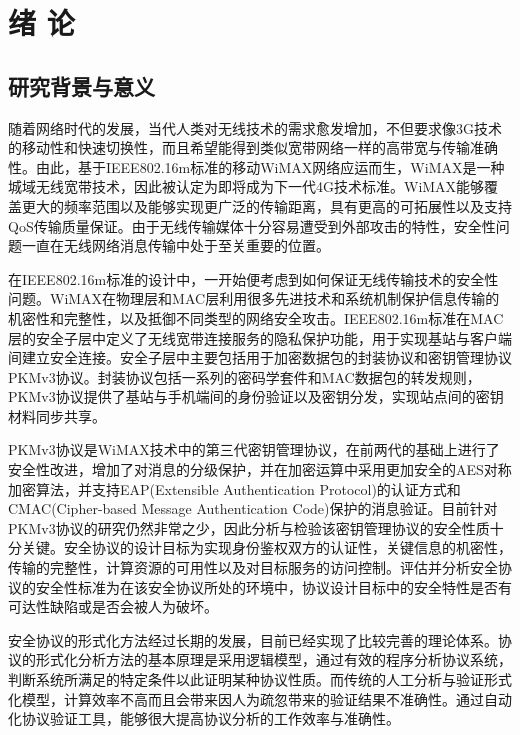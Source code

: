 \chapter{绪\hskip 0.4cm 论}


\section{研究背景与意义}

随着网络时代的发展，当代人类对无线技术的需求愈发增加，不但要求像3G技术的移动性和快速切换性，而且希望能得到类似宽带网络一样的高带宽与传输准确性。由此，基于IEEE802.16m\cite{Ieee2011IEEE}标准的移动WiMAX\cite{Andrews2007Fundamentals}网络应运而生，WiMAX是一种城域无线宽带技术，因此被认定为即将成为下一代4G技术标准。WiMAX能够覆盖更大的频率范围以及能够实现更广泛的传输距离，具有更高的可拓展性以及支持QoS传输质量保证。由于无线传输媒体十分容易遭受到外部攻击的特性，安全性问题一直在无线网络消息传输中处于至关重要的位置。

在IEEE802.16m标准的设计中，一开始便考虑到如何保证无线传输技术的安全性问题。WiMAX在物理层和MAC层利用很多先进技术和系统机制保护信息传输的机密性和完整性，以及抵御不同类型的网络安全攻击。IEEE802.16m标准在MAC层的安全子层中定义了无线宽带连接服务的隐私保护功能，用于实现基站与客户端间建立安全连接。安全子层中主要包括用于加密数据包的封装协议和密钥管理协议PKMv3协议\cite{李凤海2006无线城域网安全子层分析与研究}。封装协议包括一系列的密码学套件和MAC数据包的转发规则，PKMv3协议提供了基站与手机端间的身份验证以及密钥分发，实现站点间的密钥材料同步共享。

PKMv3协议是WiMAX技术中的第三代密钥管理协议，在前两代的基础上进行了安全性改进，增加了对消息的分级保护，并在加密运算中采用更加安全的AES对称加密算法，并支持EAP(Extensible Authentication Protocol)的认证方式和CMAC(Cipher-based Message Authentication Code)保护的消息验证。目前针对PKMv3协议的研究仍然非常之少，因此分析与检验该密钥管理协议的安全性质十分关键。安全协议的设计目标为实现身份鉴权双方的认证性，关键信息的机密性，传输的完整性，计算资源的可用性以及对目标服务的访问控制。评估并分析安全协议的安全性标准为在该安全协议所处的环境中，协议设计目标中的安全特性是否有可达性缺陷或是否会被人为破坏。

 安全协议的形式化方法经过长期的发展，目前已经实现了比较完善的理论体系。协议的形式化分析方法的基本原理是采用逻辑模型，通过有效的程序分析协议系统，判断系统所满足的特定条件以此证明某种协议性质。而传统的人工分析与验证形式化模型，计算效率不高而且会带来因人为疏忽带来的验证结果不准确性。通过自动化协议验证工具，能够很大提高协议分析的工作效率与准确性。

